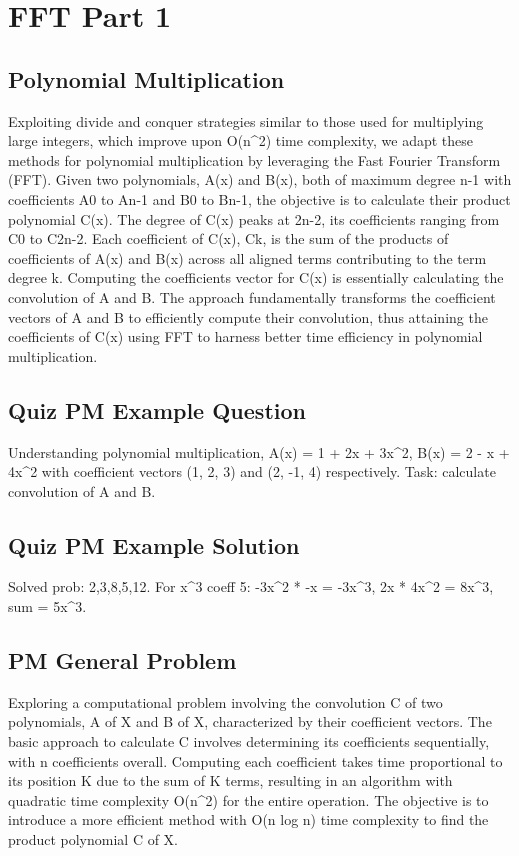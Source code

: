 \section*{FFT   Part 1}

\subsection*{Polynomial Multiplication}
Exploiting divide and conquer strategies similar to those used for multiplying large integers, which improve upon O(n\textasciicircum{}2) time complexity, we adapt these methods for polynomial multiplication by leveraging the Fast Fourier Transform (FFT).
Given two polynomials, A(x) and B(x), both of maximum degree n-1 with coefficients A0 to An-1 and B0 to Bn-1, the objective is to calculate their product polynomial C(x).
The degree of C(x) peaks at 2n-2, its coefficients ranging from C0 to C2n-2.
Each coefficient of C(x), Ck, is the sum of the products of coefficients of A(x) and B(x) across all aligned terms contributing to the term degree k.
Computing the coefficients vector for C(x) is essentially calculating the convolution of A and B\@.
The approach fundamentally transforms the coefficient vectors of A and B to efficiently compute their convolution, thus attaining the coefficients of C(x) using FFT to harness better time efficiency in polynomial multiplication.

\subsection*{Quiz  PM  Example Question}
Understanding polynomial multiplication, A(x) = 1 + 2x + 3x\textasciicircum{}2, B(x) = 2 - x + 4x\textasciicircum{}2 with coefficient vectors (1, 2, 3) and (2, -1, 4) respectively.
Task: calculate convolution of A and B\@.

\subsection*{Quiz  PM  Example Solution}
Solved prob: 2,3,8,5,12.
For x\textasciicircum{}3 coeff 5: -3x\textasciicircum{}2 * -x = -3x\textasciicircum{}3, 2x * 4x\textasciicircum{}2 = 8x\textasciicircum{}3, sum = 5x\textasciicircum{}3.

\subsection*{PM  General Problem}
Exploring a computational problem involving the convolution C of two polynomials, A of X and B of X, characterized by their coefficient vectors.
The basic approach to calculate C involves determining its coefficients sequentially, with n coefficients overall.
Computing each coefficient takes time proportional to its position K due to the sum of K terms, resulting in an algorithm with quadratic time complexity O(n\textasciicircum{}2) for the entire operation.
The objective is to introduce a more efficient method with O(n log n) time complexity to find the product polynomial C of X\@.

